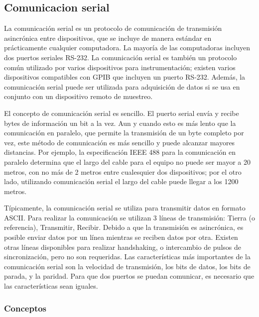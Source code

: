 
\subsection{Comunicacion serial} %
\label{sub:comunicacion_serial}

La comunicación serial es un protocolo de comunicación de transmisión asincrónica entre dispositivos, que se incluye de manera estándar en prácticamente cualquier computadora. La mayoría de las computadoras incluyen dos puertos seriales RS-232. La comunicación serial es también un protocolo común utilizado por varios dispositivos para instrumentación; existen varios dispositivos compatibles con GPIB que incluyen un puerto RS-232. Además, la comunicación serial puede ser utilizada para adquisición de datos si se usa en conjunto con un dispositivo remoto de muestreo.

El concepto de comunicación serial es sencillo. El puerto serial envía y recibe bytes de información un bit a la vez. Aun y cuando esto es más lento que la comunicación en paralelo, que permite la transmisión de un byte completo por vez, este método de comunicación es más sencillo y puede alcanzar mayores distancias. Por ejemplo, la especificación IEEE 488 para la comunicación en paralelo determina que el largo del cable para el equipo no puede ser mayor a 20 metros, con no más de 2 metros entre cualesquier dos dispositivos; por el otro lado, utilizando comunicación serial el largo del cable puede llegar a los 1200 metros.

Típicamente, la comunicación serial se utiliza para transmitir datos en formato ASCII. Para realizar la comunicación se utilizan 3 líneas de transmisión: Tierra (o referencia), Transmitir, Recibir. Debido a que la transmisión es asincrónica, es posible enviar datos por un línea mientras se reciben datos por otra. Existen otras líneas disponibles para realizar handshaking, o intercambio de pulsos de sincronización, pero no son requeridas. Las características más importantes de la comunicación serial son la velocidad de transmisión, los bits de datos, los bits de parada, y la paridad. Para que dos puertos se puedan comunicar, es necesario que las características sean iguales.\cite{intro_serial}

\subsubsection{Conceptos} %
\label{ssub:conceptos}

